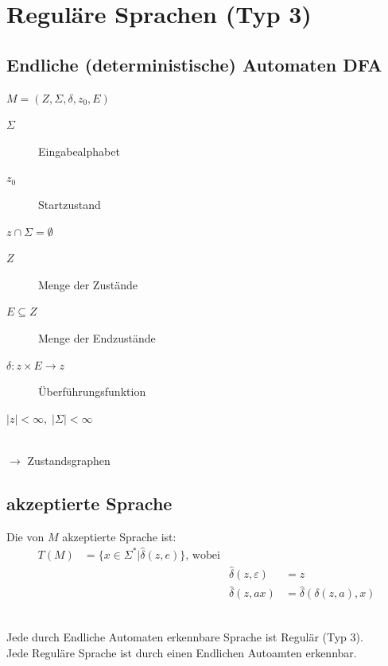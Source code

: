 \documentclass{scrartcl}
\begin{document}
\section*{Reguläre Sprachen (Typ 3)}
\subsection*{Endliche (deterministische) Automaten DFA}
\begin{minipage}{6cm}
    $M = \left(Z,\Sigma,\delta,z_0,E\right)$
    \begin{description}
        \item[$\Sigma$] Eingabealphabet
        \item[$z_0$] Startzustand
        \item[$z\cap\Sigma = \emptyset$]
    \end{description}
\end{minipage}
\begin{minipage}{5.5cm}
\begin{description}
    \item[$Z$] Menge der Zustände
    \item[$E\subseteq Z$] Menge der Endzustände
    \item[$\delta: z\times E\to z$] Überführungsfunktion
    \item[$|z|< \infty,\; |\Sigma |<\infty$]
\end{description}
\end{minipage}\\
$\to$ Zustandsgraphen

\subsection*{akzeptierte Sprache}
Die von $M$ akzeptierte Sprache ist:
\begin{align*}
    T(M) &= \{x\in\Sigma^* \vert \hat\delta(z,e)\} \textrm{, wobei}\\
    & & \hat\delta(z,\varepsilon)&=z \\
    & & \hat\delta(z,ax) &= \hat\delta\left(\delta(z,a),x\right)
\end{align*}

\begin{shaded}
    \ \\ Jede durch Endliche Automaten erkennbare Sprache ist Regulär (Typ 3).\\
    Jede Reguläre Sprache ist durch einen Endlichen Autoamten erkennbar.
\end{shaded}
\end{document}
